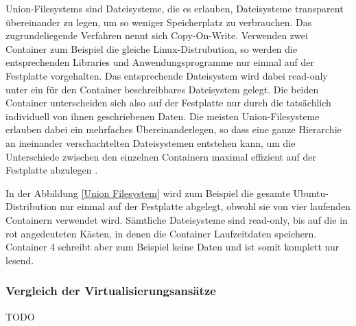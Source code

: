 Union-Filesystems sind Dateisysteme, die es erlauben, Dateisysteme transparent übereinander zu legen, um so weniger Speicherplatz zu verbrauchen. Das zugrundeliegende Verfahren nennt sich Copy-On-Write. Verwenden zwei Container zum Beispiel die gleiche Linux-Distrubution, so werden die entsprechenden Libraries und Anwendungsprogramme nur einmal auf der Festplatte vorgehalten. Das entsprechende Dateisystem wird dabei read-only unter ein für den Container beschreibbares Dateisystem gelegt. Die beiden Container unterscheiden sich also auf der Festplatte nur durch die tatsächlich individuell von ihnen geschriebenen Daten. Die meisten Union-Filesysteme erlauben dabei ein mehrfaches Übereinanderlegen, so dass eine ganze Hierarchie an ineinander verschachtelten Dateisystemen entstehen kann, um die Unterschiede zwischen den einzelnen Containern maximal effizient auf der Festplatte abzulegen \citep[Vgl.][S. 3]{Schee14}.

In der Abbildung \ref{Union Filesystem} wird zum Beispiel die gesamte Ubuntu-Distribution nur einmal auf der Festplatte abgelegt, obwohl sie von vier laufenden Containern verwendet wird. Sämtliche Dateisysteme sind read-only, bis auf die in rot angedeuteten Kästen, in denen die Container Laufzeitdaten speichern. Container 4 schreibt aber zum Beispiel keine Daten und ist somit komplett nur lesend.

\subsubsection{Vergleich der Virtualisierungsansätze}

TODO
